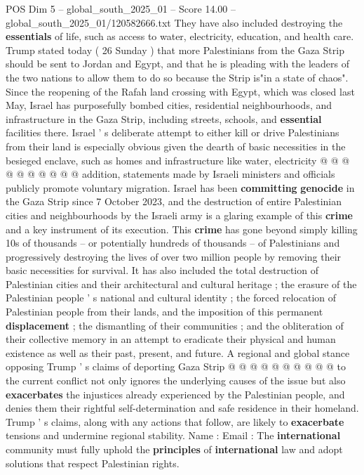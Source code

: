 \begin{textsample}{POS Dim 5 – global\_south\_2025\_01 – Score 14.00 – global\_south\_2025\_01/120582666.txt}
They have also included destroying the \textbf{essentials} of life, such as access to water, electricity, education, and health care.
Trump stated today ( 26 Sunday ) that more Palestinians from the Gaza Strip should be sent to Jordan and Egypt, and that he is pleading with the leaders of the two nations to allow them to do so because the Strip is"in a state of chaos".
Since the reopening of the Rafah land crossing with Egypt, which was closed last May, Israel has purposefully bombed cities, residential neighbourhoods, and infrastructure in the Gaza Strip, including streets, schools, and \textbf{essential} facilities there.
Israel ' s deliberate attempt to either kill or drive Palestinians from their land is especially obvious given the dearth of basic necessities in the besieged enclave, such as homes and infrastructure like water, electricity @ @ @ @ @ @ @ @ @ @ addition, statements made by Israeli ministers and officials publicly promote voluntary migration.
Israel has been \textbf{committing} \textbf{genocide} in the Gaza Strip since 7 October 2023, and the destruction of entire Palestinian cities and neighbourhoods by the Israeli army is a glaring example of this \textbf{crime} and a key instrument of its execution.
This \textbf{crime} has gone beyond simply killing 10s of thousands -- or potentially hundreds of thousands -- of Palestinians and progressively destroying the lives of over two million people by removing their basic necessities for survival.
It has also included the total destruction of Palestinian cities and their architectural and cultural heritage ; the erasure of the Palestinian people ' s national and cultural identity ; the forced relocation of Palestinian people from their lands, and the imposition of this permanent \textbf{displacement} ; the dismantling of their communities ; and the obliteration of their collective memory in an attempt to eradicate their physical and human existence as well as their past, present, and future.
A regional and global stance opposing Trump ' s claims of deporting Gaza Strip @ @ @ @ @ @ @ @ @ @ to the current conflict not only ignores the underlying causes of the issue but also \textbf{exacerbates} the injustices already experienced by the Palestinian people, and denies them their rightful self-determination and safe residence in their homeland.
Trump ' s claims, along with any actions that follow, are likely to \textbf{exacerbate} tensions and undermine regional stability.
Name : Email : The \textbf{international} community must fully uphold the \textbf{principles} of \textbf{international} law and adopt solutions that respect Palestinian rights.

\end{textsample}
